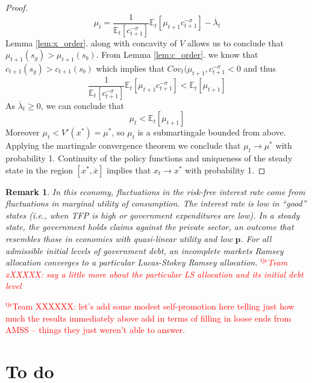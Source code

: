 \documentclass[12pt]{article}
\newcommand{\tjs}[1]{\textcolor{red}{$^{\textrm{tjs}}${#1}}}
\newcommand{\EE}{\mathbb E}
\newtheorem{remark}[theorem]{Remark}
\begin{document}
\begin{proof}
{\[
	 \mu_t = \frac{1}{\EE_t[c_{t+1}^{-\sigma}]}\EE_t[\mu_{t+1}c_{t+1}^{-\sigma}] -\overline \lambda_t
\]  Lemma  \ref{lem:x_order}. along with concavity of $V$ allows us to conclude that $\mu_{t+1}(s_g) > \mu_{t+1}(s_b)$.  From Lemma \ref{lem:c_order}. we know that $c_{t+1}(s_g) > c_{t+1}(s_b)$ which implies that $Cov_t(\mu_{t+1},c_{t+1}^{-\sigma} <0$ and thus
\[
	 \frac{1}{\EE_t[c_{t+1}^{-\sigma}]}\EE_t[\mu_{t+1}c_{t+1}^{-\sigma}]  < \EE_t[\mu_{t+1}]
\]  As $\overline \lambda_t \geq 0$, we can conclude that 
\[
	\mu_t < \EE_t[\mu_{t+1}]
\]  Moreover $\mu_t < V'(x^*) = \mu^*$, so $\mu_t$ is a submartingale bounded from above.  Applying the martingale convergence theorem we conclude that $\mu_t \rightarrow \mu^*$ with probability 1.  Continuity of the policy functions and uniqueness of the steady state in the region $[x^*,\overline x]$ implies that $x_t\rightarrow x^*$ with probability 1.}
\end{proof}

\begin{remark}
In this economy,  fluctuations in the risk-free  interest rate come from fluctuations in  marginal utility of consumption. The interest rate
 is low  in ``good'' states (i.e., when  TFP is high or government expenditures are low).
 In a steady state, the government holds claims against the private sector, an outcome that resembles those in economies
 with  quasi-linear utility and  low  $\bm{p}$.  For all admissible  initial  levels of government debt, an incomplete markets Ramsey allocation converges to a particular Lucas-Stokey  Ramsey allocation. \tjs{Team xXXXXX: say a little more about the particular LS allocation and its initial debt level}   	


\end{remark}

\tjs{Team XXXXXX: let's add some modest self-promotion here telling just how much the results immediately above add in terms of 
filling in loose ends from AMSS -- things they just weren't able to answer.}


\section{To do}
\end{document}
